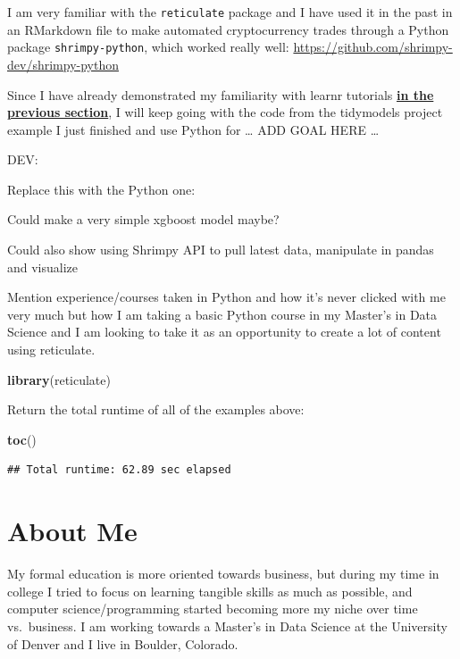\documentclass[
]{book}
\newenvironment{Shaded}{\begin{snugshade}}{\end{snugshade}}
\newcommand{\KeywordTok}[1]{\textcolor[rgb]{0.13,0.29,0.53}{\textbf{#1}}}
\newcommand{\NormalTok}[1]{#1}
\begin{document}
I am very familiar with the \texttt{reticulate} package and I have used it in the past in an RMarkdown file to make automated cryptocurrency trades through a Python package \texttt{shrimpy-python}, which worked really well: \url{https://github.com/shrimpy-dev/shrimpy-python}

Since I have already demonstrated my familiarity with learnr tutorials \textbf{\protect\hyperlink{learnr}{in the previous section}}, I will keep going with the code from the tidymodels project example I just finished and use Python for \ldots{} ADD GOAL HERE \ldots{}

DEV:

Replace this with the Python one:

Could make a very simple xgboost model maybe?

Could also show using Shrimpy API to pull latest data, manipulate in pandas and visualize

Mention experience/courses taken in Python and how it's never clicked with me very much but how I am taking a basic Python course in my Master's in Data Science and I am looking to take it as an opportunity to create a lot of content using reticulate.

\begin{Shaded}
\begin{Highlighting}[]
\KeywordTok{library}\NormalTok{(reticulate)}
\end{Highlighting}
\end{Shaded}

Return the total runtime of all of the examples above:

\begin{Shaded}
\begin{Highlighting}[]
\KeywordTok{toc}\NormalTok{()}
\end{Highlighting}
\end{Shaded}

\begin{verbatim}
## Total runtime: 62.89 sec elapsed
\end{verbatim}

\hypertarget{about-me}{%
\chapter{About Me}\label{about-me}}

My formal education is more oriented towards business, but during my time in college I tried to focus on learning tangible skills as much as possible, and computer science/programming started becoming more my niche over time vs.~business. I am working towards a Master's in Data Science at the University of Denver and I live in Boulder, Colorado.
\end{document}
